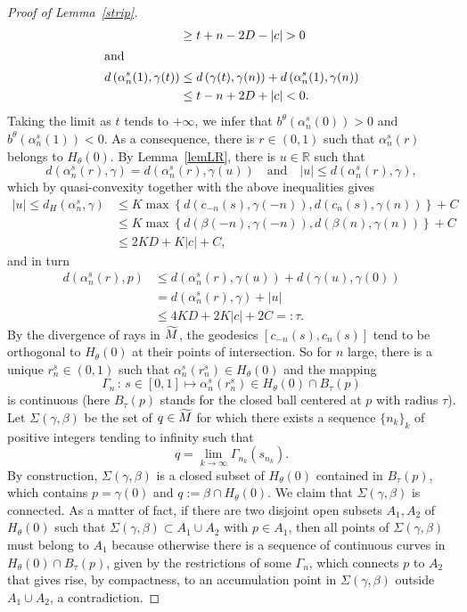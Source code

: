 \documentclass[10pt]{amsart}
\theoremstyle{definition}
\newcommand{\bbR}{\mathbb{R}}
\let\oldtilde\tilde
\renewcommand*{\tilde}[1]{\mathchoice{\widetilde{#1}}{\widetilde{#1}}{\oldtilde{#1}}{\oldtilde{#1}}}
\begin{document}
\begin{proof}[Proof of Lemma~\ref{strip}]
\begin{align*}
& \geq t+n -2 D -|c| >0
\\
\intertext{and}
d\left(\alpha_n^s(1),\gamma(t)\right) & \leq d\left(\gamma(t),\gamma(n)\right)+d\left(\alpha_n^s(1),\gamma(n)\right) \\
& \leq t-n +2 D +|c| <0.
\end{align*}
Taking the limit as $t$ tends to $+\infty$, we infer that $b^{\theta}(\alpha_n^s(0))>0$ and $b^{\theta}(\alpha_n^s(1))<0$. As a consequence, there is $r\in (0,1)$ such that $\alpha_n^s(r)$ belongs to $H_{\theta}(0)$. By Lemma~\ref{lemLR}, there is $u\in \bbR$ such that
\[
d \left(\alpha_n^s(r),\gamma\right) = d \left(\alpha_n^s(r),\gamma(u) \right) \quad \text{and} \quad |u| \leq d \left(\alpha_n^s(r),\gamma\right),
\]
which by quasi-convexity together with the above inequalities gives
\begin{align*}
|u| \leq d_{H}\left(\alpha_n^s, \gamma\right) & \leq K\max \left\{ d\left(c_{-n}(s),\gamma(-n)\right), d\left(c_n(s),\gamma(n)\right)\right\} + C\\
& \leq K\max \left\{ d\left(\beta(-n),\gamma(-n)\right), d\left(\beta(n),\gamma(n)\right)\right\} + C \\
& \leq 2KD + K|c| +C,
\end{align*}
and in turn
\begin{align*}
d \left(\alpha_n^s(r),p \right) & \leq d \left(\alpha_n^s(r),\gamma(u)\right) + d\left(\gamma(u),\gamma(0)\right) \\
& = d \left(\alpha_n^s(r),\gamma\right) + |u| \\
& \leq 4KD + 2K|c| +2C =:\tau.
\end{align*}
By the divergence of rays in $\tilde{M}$, the geodesics $[c_{-n}(s), c_{n}(s)]$ tend to be orthogonal to $H_{\theta}(0)$ at their points of intersection. So for $n$ large, there is a unique $r_{n}^s \in (0,1)$ such that $\alpha_n^s(r_n^s) \in H_{\theta}(0)$ and the mapping
\[
\Gamma_n \, : \, s \in [0,1] \longmapsto \alpha_n^s(r_n^s) \in H_{\theta}(0) \cap B_{\tau}(p)
\]
is continuous (here $B_{\tau}(p)$ stands for the closed ball centered at $p$ with radius $\tau$). Let $\Sigma(\gamma, \beta)$ be the set of $q\in \tilde{M}$ for which there exists a sequence $\{n_k\}_k$ of positive integers tending to infinity such that
\[
q = \lim_{k\rightarrow \infty} \Gamma_{n_k}\left(s_{n_k}\right).
\]
By construction, $\Sigma(\gamma, \beta)$ is a closed subset of $H_{\theta}(0)$ contained in $B_{\tau}(p)$, which contains $p=\gamma(0)$ and $q :=\beta \cap H_{\theta}(0)$. We claim that $\Sigma(\gamma, \beta)$ is connected. As a matter of fact, if there are two disjoint open subsets $A_1, A_2$ of $H_{\theta}(0)$ such that $\Sigma(\gamma, \beta)\subset A_1 \cup A_2$ with $p\in A_1$, then all points of $\Sigma(\gamma,\beta)$ must belong to $A_1$ because otherwise there is a sequence of continuous curves in $H_{\theta}(0)\cap B_{\tau}(p)$, given by the restrictions of some $\Gamma_n$, which connects $p$ to $A_2$ that gives rise, by compactness, to an accumulation point in $\Sigma(\gamma,\beta)$ outside $A_1\cup A_2$, a contradiction.


\end{proof}
\end{document}
